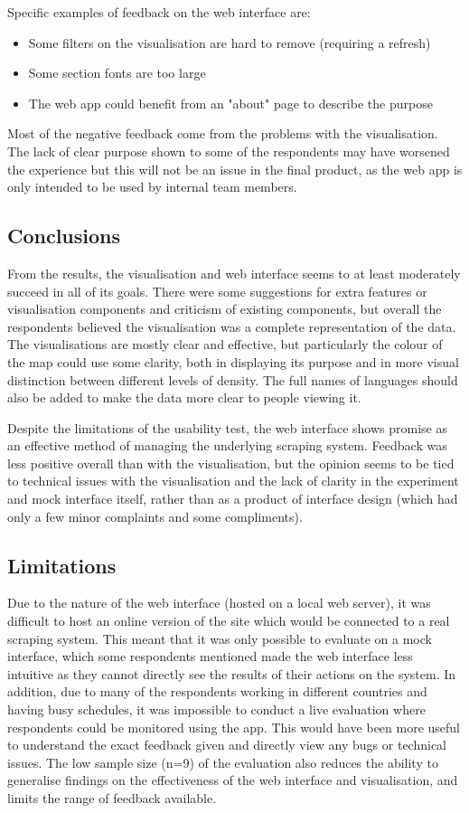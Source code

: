 \documentclass{l4proj}
\begin{document}
Specific examples of feedback on the web interface are:
\begin{itemize}
    \item Some filters on the visualisation are hard to remove (requiring a refresh)
    \item Some section fonts are too large
    \item The web app could benefit from an "about" page to describe the purpose
\end{itemize}

Most of the negative feedback come from the problems with the visualisation. The lack of clear purpose shown to some of the respondents may have worsened the experience but this will not be an issue in the final product, as the web app is only intended to be used by internal team members.

\subsection{Conclusions}
From the results, the visualisation and web interface seems to at least moderately succeed in all of its goals. There were some suggestions for extra features or visualisation components and criticism of existing components, but overall the respondents believed the visualisation was a complete representation of the data. The visualisations are mostly clear and effective, but particularly the colour of the map could use some clarity, both in displaying its purpose and in more visual distinction between different levels of density. The full names of languages should also be added to make the data more clear to people viewing it. \par
Despite the limitations of the usability test, the web interface shows promise as an effective method of managing the underlying scraping system. Feedback was less positive overall than with the visualisation, but the opinion seems to be tied to technical issues with the visualisation and the lack of clarity in the experiment and mock interface itself, rather than as a product of interface design (which had only a few minor complaints and some compliments).

\subsection{Limitations}
Due to the nature of the web interface (hosted on a local web server), it was difficult to host an online version of the site which would be connected to a real scraping system. This meant that it was only possible to evaluate on a mock interface, which some respondents mentioned made the web interface less intuitive as they cannot directly see the results of their actions on the system. In addition, due to many of the respondents working in different countries and having busy schedules, it was impossible to conduct a live evaluation where respondents could be monitored using the app. This would have been more useful to understand the exact feedback given and directly view any bugs or technical issues. The low sample size (n=9) of the evaluation also reduces the ability to generalise findings on the effectiveness of the web interface and visualisation, and limits the range of feedback available.
\end{document}
